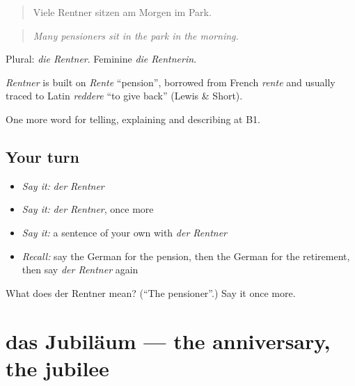 \begin{quote}
Viele Rentner sitzen am Morgen im Park.
\end{quote}

\begin{quote}
\emph{Many pensioners sit in the park in the morning.}
\end{quote}

Plural: \emph{die Rentner}. Feminine \emph{die Rentnerin}.

\begin{cousinweb}
\emph{Rentner} is built on \emph{Rente} \textquotedblleft{}pension\textquotedblright{}, borrowed from French \emph{rente} and usually traced to Latin \emph{reddere} \textquotedblleft{}to give back\textquotedblright{} (Lewis \& Short).
\end{cousinweb}

\begin{grammarlens}[title={What you've built}]
One more word for telling, explaining and describing at B1.
\end{grammarlens}

\subsection*{Your turn}
\begin{itemize}
\raggedright
  \item \emph{Say it:} \emph{der Rentner}
  \item \emph{Say it:} \emph{der Rentner}, once more
  \item \emph{Say it:} a sentence of your own with \emph{der Rentner}
  \item \emph{Recall:} say the German for the pension, then the German for the retirement, then say \emph{der Rentner} again
\end{itemize}

\begin{tcolorbox}[breakable,colback=teal!4,colframe=teal!35!black,title={Before you move on}]
What does der Rentner mean? (\textquotedblleft{}The pensioner\textquotedblright{}.) Say it once more.
\end{tcolorbox}
\section[das Jubiläum]{das Jubiläum — the anniversary, the jubilee}

\label{lesson:GE-C302-jubilaeum}



